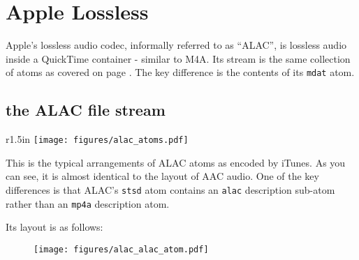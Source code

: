 \chapter{Apple Lossless}

Apple's lossless audio codec, informally referred to as ``ALAC'',
is lossless audio inside a QuickTime container - similar to M4A.
Its stream is the same collection of atoms as covered on page
\pageref{m4a}.
The key difference is the contents of its \texttt{mdat} atom.

\section{the ALAC file stream}
\begin{wrapfigure}[6]{r}{1.5in}
\texttt{[image: figures/alac\_atoms.pdf]}
\end{wrapfigure}

This is the typical arrangements of ALAC atoms as encoded by iTunes.
As you can see, it is almost identical to the layout of AAC audio.
One of the key differences is that ALAC's \texttt{stsd} atom
contains an \texttt{alac} description sub-atom rather than an
\texttt{mp4a} description atom.

Its layout is as follows:

\begin{figure}[h]
\texttt{[image: figures/alac\_alac\_atom.pdf]}
\end{figure}

\pagebreak
